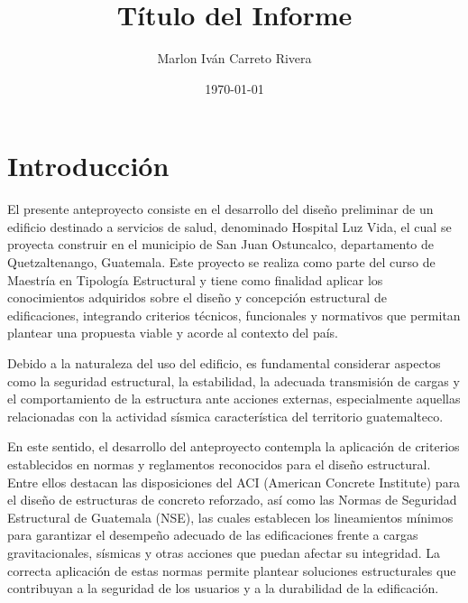 \documentclass[14pt,letterpaper]{extarticle}
\title{\textbf{Título del Informe}}
\author{Marlon Iván Carreto Rivera}
\date{\today}
\begin{document}
	


	\newpage
	
	\renewcommand{\contentsname}{Contenido}
	\tableofcontents
	\newpage
	
	
	\section*{Introducción }
		
	El presente anteproyecto consiste en el desarrollo del diseño preliminar de un edificio destinado a servicios de salud, denominado Hospital Luz Vida, el cual se proyecta construir en el municipio de San Juan Ostuncalco, departamento de Quetzaltenango, Guatemala. Este proyecto se realiza como parte del curso de Maestría en Tipología Estructural y tiene como finalidad aplicar los conocimientos adquiridos sobre el diseño y concepción estructural de edificaciones, integrando criterios técnicos, funcionales y normativos que permitan plantear una propuesta viable y acorde al contexto del país.
	
	 Debido a la naturaleza del uso del edificio, es fundamental considerar aspectos como la seguridad estructural, la estabilidad, la adecuada transmisión de cargas y el comportamiento de la estructura ante acciones externas, especialmente aquellas relacionadas con la actividad sísmica característica del territorio guatemalteco.
	
	En este sentido, el desarrollo del anteproyecto contempla la aplicación de criterios establecidos en normas y reglamentos reconocidos para el diseño estructural. Entre ellos destacan las disposiciones del ACI (American Concrete Institute) para el diseño de estructuras de concreto reforzado, así como las Normas de Seguridad Estructural de Guatemala (NSE), las cuales establecen los lineamientos mínimos para garantizar el desempeño adecuado de las edificaciones frente a cargas gravitacionales, sísmicas y otras acciones que puedan afectar su integridad. La correcta aplicación de estas normas permite plantear soluciones estructurales que contribuyan a la seguridad de los usuarios y a la durabilidad de la edificación.
	
\end{document}
